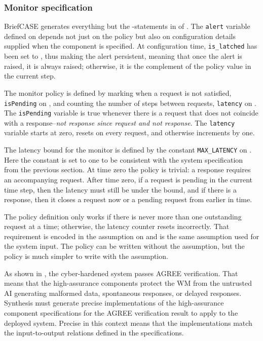 \subsubsection{Monitor specification}
BriefCASE generates everything but the
-statements in  of
.
The
\texttt{alert} variable defined on  depends
not just on the policy but also on configuration details supplied when
the component is specified.  At configuration
time, \texttt{is\_latched} has been set to , thus making
the alert persistent, meaning that once the alert is raised, it is
always raised; otherwise, it is the complement of the policy value in
the current step.

The monitor policy is defined by marking when a request is not
satisfied, \texttt{isPending} on , and
counting the number of steps between requests, \texttt{latency} on
.  The \texttt{isPending} variable is true
whenever there is a request that does not coincide with a
response--\emph{not response since request and not response}.  The
\texttt{latency} variable starts at zero, resets on every request, and
otherwise increments by one.

The latency bound for the monitor is defined by the constant
\texttt{MAX\_LATENCY} on .  Here the constant
is set to one to be consistent with the system specification from the
previous section.  At time zero the policy is trivial: a response
requires an accompanying request.  After time zero, if a request is
pending in the current time step, then the latency must still be under
the bound, and if there is a response, then it closes a request now or
a pending request from earlier in time.

The policy definition only works if there is never more than one
outstanding request at a time; otherwise, the latency counter resets
incorrectly.  That requirement is encoded in the assumption on
 and is the same assumption used for the
system input.  The policy can be written without the assumption, 
but the policy is much simpler to write with the assumption.

As shown in , the cyber-hardened
system passes AGREE verification.  That means that the high-assurance
components protect the WM from the untrusted AI generating malformed
data, spontaneous responses, or delayed responses.  Synthesis must
generate precise implementations of the high-assurance component
specifications for the AGREE verification result to apply to the
deployed system.  Precise in this context means that the
implementations match the input-to-output relations defined in the
specifications.
